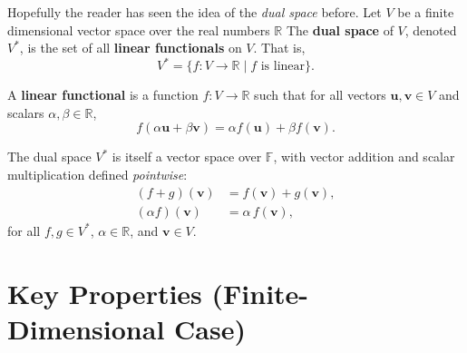 \documentclass[11pt]{article}
\begin{document}
Hopefully the reader has seen the idea of the \emph{dual space} before. Let $ V $ be a finite dimensional vector space over the real numbers $ \mathbb{R} $  
The \textbf{dual space} of $ V $, denoted $ V^* $, is the set of all \textbf{linear functionals} on $ V $. That is,
\[
V^* = \{ f: V \to \mathbb{R} \mid f \text{ is linear} \}.
\]

A \textbf{linear functional} is a function $ f: V \to \mathbb{R} $ such that for all vectors $ \mathbf{u}, \mathbf{v} \in V $ and scalars $ \alpha, \beta \in \mathbb{R} $,
\[
f(\alpha \mathbf{u} + \beta \mathbf{v}) = \alpha f(\mathbf{u}) + \beta f(\mathbf{v}).
\]

The dual space $ V^* $ is itself a vector space over $ \mathbb{F} $, with vector addition and scalar multiplication defined \textit{pointwise}:
\begin{align*}
(f + g)(\mathbf{v}) &= f(\mathbf{v}) + g(\mathbf{v}), \\
(\alpha f)(\mathbf{v}) &= \alpha \, f(\mathbf{v}),
\end{align*}
for all $ f, g \in V^* $, $ \alpha \in \mathbb{R} $, and $ \mathbf{v} \in V $.

\section*{Key Properties (Finite-Dimensional Case)}
\end{document}
